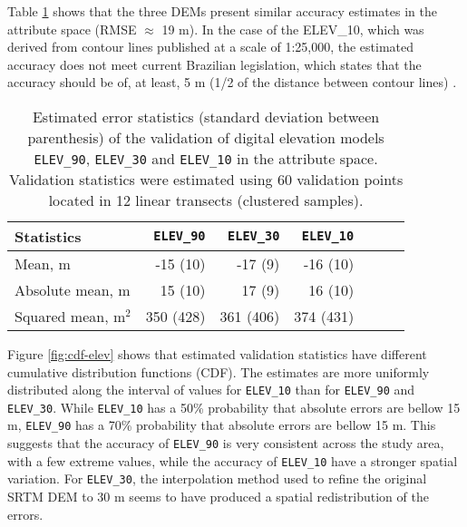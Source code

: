 Table \ref{tab:dem-attr-val} shows that the three DEMs present similar accuracy estimates in the attribute space (RMSE $\approx$ 19 m). In the case of the ELEV\_10, which was derived from contour lines published at a scale of 1:25,000, the estimated accuracy does not meet current Brazilian legislation, which states that the accuracy should be of, at least, 5 m (1/2 of the distance between contour lines) \cite{Brasil1984}.
 
\begin{table}[ht]
  \caption{Estimated error statistics (standard deviation between parenthesis) of the validation of digital elevation models \texttt{ELEV\_90}, \texttt{ELEV\_30} and \texttt{ELEV\_10} in the attribute space. Validation statistics were estimated using 60 validation points located in 12 linear transects (clustered samples).}
  \label{tab:dem-attr-val}
  \centering
  {\small
  \begin{tabular}{lrrrrrr}
    \hline
    Statistics           & \texttt{ELEV\_90} & \texttt{ELEV\_30} & \texttt{ELEV\_10} \\
    \hline
    Mean, m              & -15 (10)          & -17 (9)           & -16 (10)          \\ 
    Absolute mean, m     & 15  (10)          & 17  (9)           & 16  (10)          \\ 
    Squared mean, m$^2$  & 350 (428)         & 361 (406)         & 374 (431)         \\ 
    \hline
  \end{tabular}}
\end{table}

Figure \ref{fig:cdf-elev} shows that estimated validation statistics have different cumulative distribution functions (CDF). The estimates are more uniformly distributed along the interval of values for \texttt{ELEV\_10} than for \texttt{ELEV\_90} and \texttt{ELEV\_30}. While \texttt{ELEV\_10} has a 50\% probability that absolute errors are bellow 15 m, \texttt{ELEV\_90} has a 70\% probability that absolute errors are bellow 15 m. This suggests that the accuracy of \texttt{ELEV\_90} is very consistent across the study area, with a few extreme values, while the accuracy of \texttt{ELEV\_10} have a stronger spatial variation. For \texttt{ELEV\_30}, the interpolation method used to refine the original SRTM DEM to 30 m \cite{ValerianoEtAl2012} seems to have produced a spatial redistribution of the errors.


